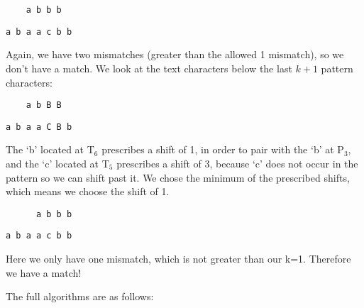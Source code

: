 \documentclass[10pt]{article}
\begin{document}
\vspace{12pt}

\noindent \verb/    a b b b/

\noindent \verb/a b a a c b b/

\vspace{12pt}

Again, we have two mismatches (greater than the allowed 1 mismatch), so we don't have a match. We look at the text
characters below the last $k+1$ pattern characters:

\vspace{12pt}

\noindent \verb/    a b B B/

\noindent \verb/a b a a C B b/

\vspace{12pt}

The `b' located at T$_{6}$ prescribes a shift of 1, in order to pair with the `b' at P$_{3}$, and the `c' located at T$_{5}$ prescribes
a shift of 3, because `c' does not occur in the pattern so we can shift past it. We chose the minimum of the prescribed
shifts, which means we choose the shift of 1.

\vspace{12pt}

\noindent \verb/      a b b b/

\noindent \verb/a b a a c b b/

\vspace{12pt}

Here we only have one mismatch, which is not greater than our k=1. Therefore we have a match!

\vspace{12pt}

The full algorithms are as follows:

\end{document}

